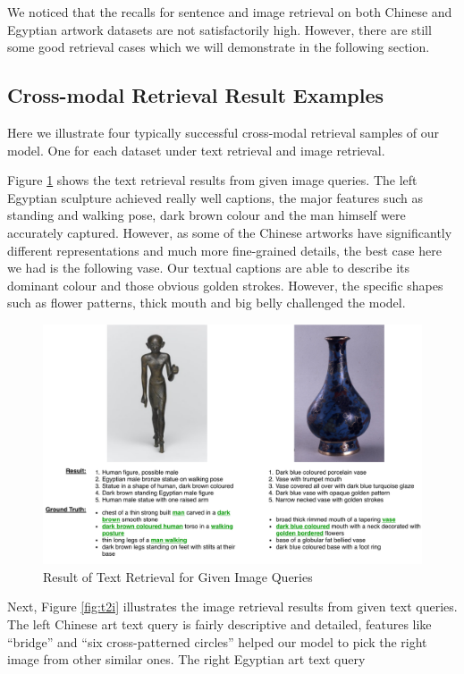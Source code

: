 We noticed that the recalls for sentence and image retrieval on both Chinese and Egyptian artwork datasets are not satisfactorily high. However, there are still some good retrieval cases which we will demonstrate in the following section.

\subsection{Cross-modal Retrieval Result Examples}
Here we illustrate four typically successful cross-modal retrieval samples of our model. One for each dataset under text retrieval and image retrieval. 

Figure \ref{fig:i2t} shows the text retrieval results from given image queries. The left Egyptian sculpture achieved really well captions, the major features such as standing and walking pose, dark brown colour and the man himself were accurately captured. However, as some of the Chinese artworks have significantly different representations and much more fine-grained details, the best case here we had is the following vase. Our textual captions are able to describe its dominant colour and those obvious golden strokes. However, the specific shapes such as flower patterns, thick mouth and big belly challenged the model.

\begin{figure}[h!]
\centering
\includegraphics[width=\textwidth]{i2t.pdf}
\caption{Result of Text Retrieval for Given Image Queries}
\label{fig:i2t}
\end{figure}

Next, Figure \ref{fig:t2i} illustrates the image retrieval results from given text queries. The left Chinese art text query is fairly descriptive and detailed, features like ``bridge'' and ``six cross-patterned circles'' helped our model to pick the right image from other similar ones. The right Egyptian art text query

